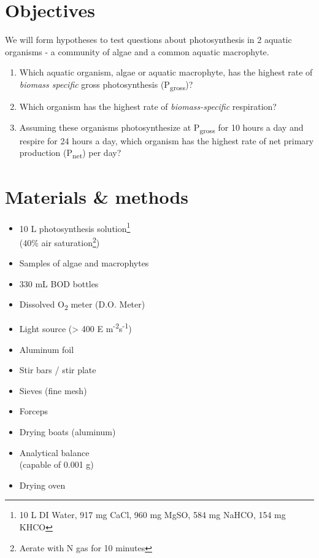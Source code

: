 \documentclass[]{krantz}
\theoremstyle{definition}
\theoremstyle{definition}
\theoremstyle{definition}
\theoremstyle{remark}
\begin{document}
\section{Objectives}\label{objectives-1}

We will form hypotheses to test questions about photosynthesis in 2
aquatic organisms - a community of algae and a common aquatic
macrophyte.

\begin{enumerate}
\def\labelenumi{\arabic{enumi}.}
\item
  Which aquatic organism, algae or aquatic macrophyte, has the highest
  rate of \emph{biomass specific} gross photosynthesis
  (P\textsubscript{gross})?
\item
  Which organism has the highest rate of \emph{biomass-specific}
  respiration?
\item
  Assuming these organisms photosynthesize at P\textsubscript{gross} for
  10 hours a day and respire for 24 hours a day, which organism has the
  highest rate of net primary production (P\textsubscript{net}) per day?
\end{enumerate}

\section{Materials \& methods}\label{materials-methods}

\begin{multicols}{2}
\begin{itemize}{}
  \item 10 L photosynthesis solution\footnote{10 L DI Water, 917 mg CaCl, 960 mg MgSO, 584 mg NaHCO, 154 mg KHCO}\\(40\% air saturation\footnote{Aerate with N gas for 10 minutes})
  \item Samples of algae and macrophytes
  \item 330 mL BOD bottles
  \item Dissolved O\textsubscript{2} meter (D.O. Meter)
  \item Light source (> 400 \textmu E m\textsuperscript{-2}s\textsuperscript{-1})
  \item Aluminum foil
  \item Stir bars / stir plate
  \item Sieves (fine mesh)
  \item Forceps
  \item Drying boats (aluminum)
  \item Analytical balance \\(capable of 0.001 g)
  \item Drying oven
\end{itemize}
\end{multicols}
\end{document}
